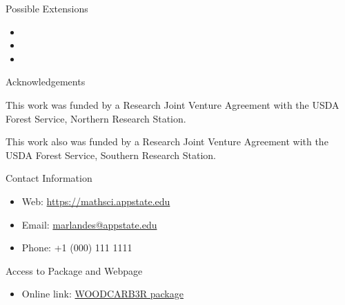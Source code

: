 \documentclass[final]{beamer}\usepackage[]{graphicx}\usepackage[]{color}
\newlength{\onecolwid}
\begin{document}
\begin{frame}[t]
\begin{columns}[t]
\begin{column}{\onecolwid}
\begin{block}{Possible Extensions}

\begin{itemize}
\item
\item
\item
\end{itemize}
\end{block}




\begin{block}{Acknowledgements}

This work was funded by a Research Joint Venture Agreement with the USDA Forest Service, Northern Research Station.

This work also was funded by a Research Joint Venture Agreement with the USDA Forest Service, Southern Research Station.

\end{block}



\begin{alertblock}{Contact Information}

\begin{itemize}
\item Web: \href{https://mathsci.appstate.edu}{https://mathsci.appstate.edu}
\item Email: \href{marlandes@appstate.edu}{marlandes@appstate.edu}
\item Phone: +1 (000) 111 1111
\end{itemize}

\end{alertblock}

\begin{block}{Access to Package and Webpage}
\begin{itemize}
\item Online link: \href{http://benjones2.github.io/WOODCARB3R/}{WOODCARB3R package}


\end{itemize}
\end{block}
\end{column}
\end{columns}
\end{frame}
\end{document}
